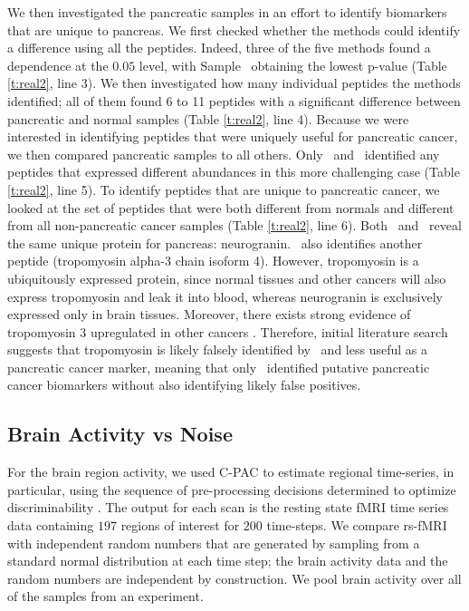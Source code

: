 \documentclass[11pt]{extarticle}
\begin{document}
We then investigated the pancreatic samples in an effort to identify biomarkers that are unique to pancreas. We first checked whether the methods could identify a difference using all the peptides.  Indeed, three of the five methods found a dependence at the $0.05$ level, with Sample \Mgc~obtaining the lowest p-value (Table \ref{t:real2}, line 3).  We then investigated how many individual peptides the methods identified; all of them found 6 to 11 peptides with a significant difference between pancreatic and normal samples (Table \ref{t:real2}, line 4).  Because we were interested in identifying peptides that were uniquely useful for pancreatic cancer, we then compared pancreatic samples to all others.  Only \Mgc~and \Hhg~identified any peptides that expressed different abundances in this more challenging case (Table \ref{t:real2}, line 5).  To identify peptides that are unique to pancreatic cancer, we looked at the set of peptides that were both different from normals and different from all non-pancreatic cancer samples (Table \ref{t:real2}, line 6).  
Both \Mgc~and \Hhg~reveal the same unique protein for pancreas: neurogranin. \Hhg~also identifies another peptide (tropomyosin alpha-3 chain isoform 4). However, tropomyosin is a ubiquitously expressed protein, since normal tissues and other cancers will also express tropomyosin and leak it into blood, whereas neurogranin is exclusively expressed only in brain tissues. Moreover, there exists strong evidence of tropomyosin 3 upregulated in other cancers \cite{TPM1,TPM2,TPM3,TPM4}. Therefore, initial literature search suggests that tropomyosin is likely falsely identified by \Hhg~and less useful as a  pancreatic cancer marker, meaning that only \Mgc~identified putative pancreatic cancer biomarkers without also identifying likely false positives.



\subsection{Brain Activity vs Noise}
\label{app:noise}

For the brain region activity, we used C-PAC to estimate regional time-series, in particular, using the sequence of pre-processing decisions determined to optimize discriminability \cite{Wang2016}.  The output for each scan is the resting state fMRI time series data containing $197$ regions of interest for $200$ time-steps.
We compare rs-fMRI with independent random numbers that are generated by sampling from a standard normal distribution at each time step; the brain activity data and the random numbers are independent by construction. We pool brain activity over all of the samples from an experiment.
\end{document}
